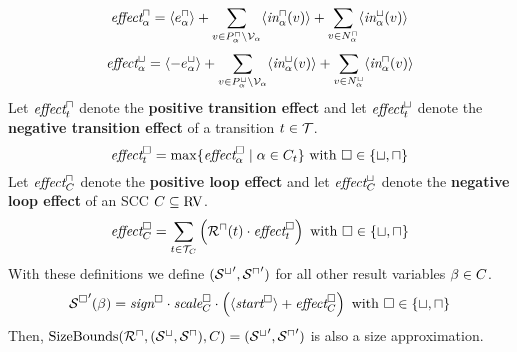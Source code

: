 \begin{theorem}
  \[ \emph{effect}^\sqcap_\alpha = \langle e^{\sqcap}_\alpha\rangle + \sum_{v \in P_\alpha^\sqcap \setminus \mathcal{V}_\alpha} \langle\emph{in}^\sqcap_\alpha(v)\rangle + \sum_{v \in N_\alpha^\sqcap} \langle\emph{in}^\sqcup_\alpha(v)\rangle \]
  \[ \emph{effect}^\sqcup_\alpha = \langle-e^{\sqcup}_\alpha\rangle + \sum_{v \in P_\alpha^\sqcup \setminus \mathcal{V}_\alpha} \langle\emph{in}^\sqcup_\alpha(v)\rangle + \sum_{v \in N_\alpha^\sqcup} \langle\emph{in}^\sqcap_\alpha(v)\rangle \]
  Let $\emph{effect}^\sqcap_t$ denote the \textbf{positive transition effect} and let $\emph{effect}^\sqcup_t$ denote the \textbf{negative transition effect} of a transition $t \in \mathcal{T}$.
  \[ \emph{effect}^\square_t = \max \lbrace \emph{effect}^\square_\alpha \mid \alpha \in C_t  \rbrace \text{ with } \square \in \lbrace \sqcup, \sqcap \rbrace \]
  Let $\emph{effect}^\sqcap_C$ denote the \textbf{positive loop effect} and let $\emph{effect}^\sqcup_C$ denote the \textbf{negative loop effect} of an SCC $C \subseteq \text{RV}$.
  \[ \emph{effect}^\square_C = \sum_{t \in \mathcal{T}_C} \left( {\mathcal{R}^\sqcap}(t) \cdot \emph{effect}^\square_t \right) \text{ with } \square \in \lbrace \sqcup, \sqcap \rbrace \]
  With these definitions we define $({\mathcal{S}^\sqcup}', {\mathcal{S}^\sqcap}')$ for all other result variables $\beta \in C$.
  \[ {\mathcal{S}^\square}'(\beta) = \emph{sign}^\square \cdot \emph{scale}^\square_C \cdot \left( \langle\emph{start}^\square\rangle + \emph{effect}^\square_C \right) \text{ with } \square \in \lbrace \sqcup, \sqcap \rbrace \]
  Then, $\text{SizeBounds}({\mathcal{R}^\sqcap}, {({\mathcal{S}^\sqcup}, {\mathcal{S}^\sqcap})}, C) = ({\mathcal{S}^\sqcup}', {\mathcal{S}^\sqcap}')$ is also a size approximation. 
\end{theorem}
